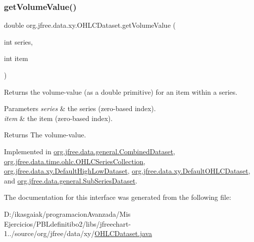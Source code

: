\subsubsection{\texorpdfstring{get\+Volume\+Value()}{getVolumeValue()}}
{\footnotesize\ttfamily double org.\+jfree.\+data.\+xy.\+O\+H\+L\+C\+Dataset.\+get\+Volume\+Value (\begin{DoxyParamCaption}\item[{int}]{series,  }\item[{int}]{item }\end{DoxyParamCaption})}

Returns the volume-\/value (as a double primitive) for an item within a series.


\begin{DoxyParams}{Parameters}
{\em series} & the series (zero-\/based index). \\
\hline
{\em item} & the item (zero-\/based index).\\
\hline
\end{DoxyParams}
\begin{DoxyReturn}{Returns}
The volume-\/value. 
\end{DoxyReturn}


Implemented in \mbox{\hyperlink{classorg_1_1jfree_1_1data_1_1general_1_1_combined_dataset_a8d5839a8b62e420e5f7cab7106440a19}{org.\+jfree.\+data.\+general.\+Combined\+Dataset}}, \mbox{\hyperlink{classorg_1_1jfree_1_1data_1_1time_1_1ohlc_1_1_o_h_l_c_series_collection_aaf9b44fedb9a8de27d541cb6e86c349b}{org.\+jfree.\+data.\+time.\+ohlc.\+O\+H\+L\+C\+Series\+Collection}}, \mbox{\hyperlink{classorg_1_1jfree_1_1data_1_1xy_1_1_default_high_low_dataset_af97ca5089ee14cddbd768a78af00a501}{org.\+jfree.\+data.\+xy.\+Default\+High\+Low\+Dataset}}, \mbox{\hyperlink{classorg_1_1jfree_1_1data_1_1xy_1_1_default_o_h_l_c_dataset_ab7daa41ae6b486616cc15c3b90212c15}{org.\+jfree.\+data.\+xy.\+Default\+O\+H\+L\+C\+Dataset}}, and \mbox{\hyperlink{classorg_1_1jfree_1_1data_1_1general_1_1_sub_series_dataset_ae13206ea086cd80ef9b9a4cb11c8b174}{org.\+jfree.\+data.\+general.\+Sub\+Series\+Dataset}}.



The documentation for this interface was generated from the following file\+:\begin{DoxyCompactItemize}
\item 
D\+:/ikasgaiak/programacion\+Avanzada/\+Mis Ejercicios/\+P\+B\+Ldefinitibo2/libs/jfreechart-\/1../source/org/jfree/data/xy/\mbox{\hyperlink{_o_h_l_c_dataset_8java}{O\+H\+L\+C\+Dataset.\+java}}\end{DoxyCompactItemize}
